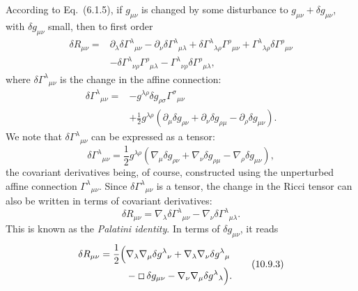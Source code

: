 According to Eq.~(6.1.5), if \(g_{\mu\nu}\) is changed by some disturbance
to \(g_{\mu\nu}+\delta g_{\mu\nu}\), with \(\delta g_{\mu\nu}\) small,
then to first order
\[
  \begin{split}
  \delta R_{\mu\nu}
  ={}&
  \partial_\lambda\delta\Gamma^\lambda{}_{\mu\nu}
  -\partial_\nu\delta\Gamma^\lambda{}_{\mu\lambda}
  +\delta\Gamma^\lambda{}_{\lambda\rho}
   \Gamma^\rho{}_{\mu\nu}
  +\Gamma^\lambda{}_{\lambda\rho}
   \delta\Gamma^\rho{}_{\mu\nu}
  \\
  &-
  \delta\Gamma^\lambda{}_{\nu\rho}
  \Gamma^\rho{}_{\mu\lambda}
  -\Gamma^\lambda{}_{\nu\rho}
  \delta\Gamma^\rho{}_{\mu\lambda},
  \end{split}
\]
where \(\delta\Gamma^\lambda{}_{\mu\nu}\) is the change in the affine
connection:
\[
  \begin{split}
  \delta\Gamma^\lambda{}_{\mu\nu}
  ={}&
  -g^{\lambda\rho}\delta g_{\rho\sigma}
  \Gamma^\sigma{}_{\mu\nu}
  \\
  &+
  \frac12g^{\lambda\rho}
  \left(
    \partial_\mu\delta g_{\rho\nu}
    +\partial_\nu\delta g_{\rho\mu}
    -\partial_\rho\delta g_{\mu\nu}
  \right).
  \end{split}
\]
We note that \(\delta\Gamma^\lambda{}_{\mu\nu}\) can be expressed as a
tensor:
\begin{equation}
  \delta\Gamma^\lambda{}_{\mu\nu}
  =
  \frac12g^{\lambda\rho}
  \left(
    \nabla_\mu\delta g_{\rho\nu}
    +\nabla_\nu\delta g_{\rho\mu}
    -\nabla_\rho\delta g_{\mu\nu}
  \right),
  \tag{10.9.1}\label{eq:10.9.1}
\end{equation}
the covariant derivatives being, of course, constructed using the
unperturbed affine connection \(\Gamma^\lambda{}_{\mu\nu}\). Since
\(\delta\Gamma^\lambda{}_{\mu\nu}\) is a tensor, the change in the Ricci
tensor can also be written in terms of covariant derivatives:
\begin{equation}
  \delta R_{\mu\nu}
  =
  \nabla_\lambda\delta\Gamma^\lambda{}_{\mu\nu}
  -\nabla_\nu\delta\Gamma^\lambda{}_{\mu\lambda}.
  \tag{10.9.2}\label{eq:10.9.2}
\end{equation}
This is known as the \emph{Palatini identity}. In terms of
\(\delta g_{\mu\nu}\), it reads
\begin{equation}
  \begin{split}
  \delta R_{\mu\nu}
  =
  \frac12\Bigl(
    &\nabla_\lambda\nabla_\mu
      \delta g^\lambda{}_\nu
    +\nabla_\lambda\nabla_\nu
      \delta g^\lambda{}_\mu
  \\
    &-\Box\,\delta g_{\mu\nu}
    -\nabla_\nu\nabla_\mu
      \delta g^\lambda{}_\lambda
  \Bigr).
  \end{split}
  \tag{10.9.3}\label{eq:10.9.3}
\end{equation}

